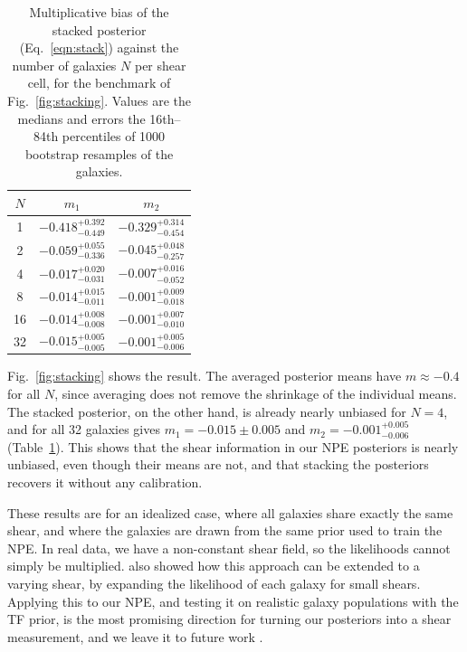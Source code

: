 \begin{table}
\centering
\caption{Multiplicative bias of the stacked posterior (Eq.~\ref{eqn:stack}) against the number of galaxies $N$ per shear cell, for the benchmark of Fig.~\ref{fig:stacking}. Values are the medians and errors the 16th--84th percentiles of 1000 bootstrap resamples of the galaxies.}
\label{tab:stacking}
\begin{tabular}{ccc}
\toprule
$N$ & $m_1$ & $m_2$ \\
\midrule
1 & $-0.418^{+0.392}_{-0.449}$ & $-0.329^{+0.314}_{-0.454}$ \\
2 & $-0.059^{+0.055}_{-0.336}$ & $-0.045^{+0.048}_{-0.257}$ \\
4 & $-0.017^{+0.020}_{-0.031}$ & $-0.007^{+0.016}_{-0.052}$ \\
8 & $-0.014^{+0.015}_{-0.011}$ & $-0.001^{+0.009}_{-0.018}$ \\
16 & $-0.014^{+0.008}_{-0.008}$ & $-0.001^{+0.007}_{-0.010}$ \\
32 & $-0.015^{+0.005}_{-0.005}$ & $-0.001^{+0.005}_{-0.006}$ \\
\bottomrule
\end{tabular}
\end{table}

Fig.~\ref{fig:stacking} shows the result. The averaged posterior means have $m \approx -0.4$ for all $N$, since averaging does not remove the shrinkage of the individual means. The stacked posterior, on the other hand, is already nearly unbiased for $N = 4$, and for all 32 galaxies gives $m_1 = -0.015 \pm 0.005$ and $m_2 = -0.001^{+0.005}_{-0.006}$ (Table~\ref{tab:stacking}). This shows that the shear information in our NPE posteriors is nearly unbiased, even though their means are not, and that stacking the posteriors recovers it without any calibration.

These results are for an idealized case, where all galaxies share exactly the same shear, and where the galaxies are drawn from the same prior used to train the NPE. In real data, we have a non-constant shear field, so the likelihoods cannot simply be multiplied. \citep{BA14} also showed how this approach can be extended to a varying shear, by expanding the likelihood of each galaxy for small shears. Applying this to our NPE, and testing it on realistic galaxy populations with the TF prior, is the most promising direction for turning our posteriors into a shear measurement, and we leave it to future work .
